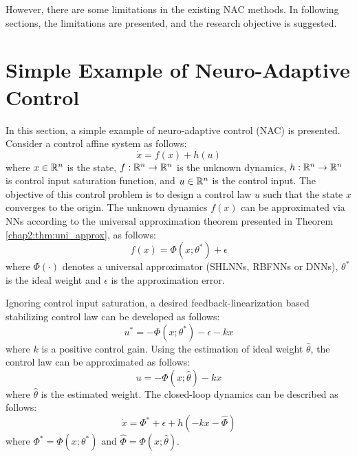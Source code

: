 However, there are some limitations in the existing NAC methods.
In following sections, the limitations are presented, and the research objective is suggested.

\section{Simple Example of Neuro-Adaptive Control} \label{chap1:sec:example}

In this section, a simple example of neuro-adaptive control (NAC) is presented.
Consider a control affine system as follows:
\begin{equation}
    \dot x = f(x) + h(u)
\end{equation}
where $x \in \mathbb{R}^n$ is the state, $f:\mathbb{R}^n\to\mathbb{R}^n$ is the unknown dynamics, $h:\mathbb{R}^n\to\mathbb{R}^n$ is control input saturation function, and $u \in \mathbb{R}^n$ is the control input.
The objective of this control problem is to design a control law $u$ such that the state $x$ converges to the origin.
The unknown dynamics $f(x)$ can be approximated via NNs according to the universal approximation theorem presented in Theorem \ref{chap2:thm:uni_approx}, as follows:
\begin{equation}
    f(x) = \Phi(x;\theta^*) + \epsilon
\end{equation}
where $\Phi(\cdot)$ denotes a universal approximator (\eg SHLNNs, RBFNNs or DNNs), $\theta^*$ is the ideal weight and $\epsilon$ is the approximation error.

Ignoring control input saturation, a desired feedback-linearization based stabilizing control law can be developed as follows:
\begin{equation}
    u^* = -\Phi(x;\theta^*) - \epsilon - k x
\end{equation}
where $k$ is a positive control gain. 
Using the estimation of ideal weight $\hat\theta$, the control law can be approximated as follows:
\begin{equation}
    u = -\Phi(x;\hat\theta) - k x
\end{equation}
where $\hat\theta$ is the estimated weight.
The closed-loop dynamics can be described as follows:
\begin{equation}
    \dot x = \Phi^*+\epsilon + h(-kx-\hat\Phi )
\end{equation}
where $\Phi^* = \Phi(x;\theta^*)$ and $\hat\Phi = \Phi(x;\hat\theta)$.

